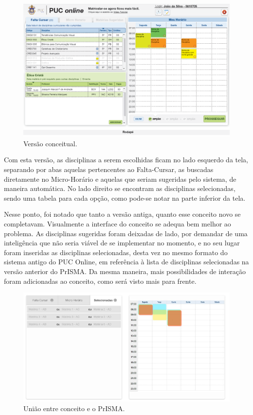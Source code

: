 \documentclass[graduacao,brazil]{ThesisPUC}
\begin{document}
\begin{figure}[H]
    \centering
    \includegraphics[width=\linewidth]{img/designer.png}
    \caption{Versão conceitual.}
\end{figure}

Com esta versão, as disciplinas a serem escolhidas ficam no lado esquerdo da tela, separando por abas aquelas pertencentes ao Falta-Cursar, as buscadas diretamente no Micro-Horário e aquelas que seriam sugeridas pelo sistema, de maneira automática. No lado direito se encontram as disciplinas selecionadas, sendo uma tabela para cada opção, como pode-se notar na parte inferior da tela.

Nesse ponto, foi notado que tanto a versão antiga, quanto esse conceito novo se completavam. Visualmente a interface do conceito se adequa bem melhor ao problema. As disciplinas sugeridas foram deixadas de lado, por demandar de uma inteligência que não seria viável de se implementar no momento, e no seu lugar foram inseridas as disciplinas selecionadas, desta vez no mesmo formato do sistema antigo do PUC Online, em referência à lista de disciplinas selecionadas na versão anterior do PrISMA. Da mesma maneira, mais possibilidades de interação foram adicionadas ao conceito, como será visto mais para frente.

\begin{figure}[H]
    \centering
    \includegraphics[width=\linewidth]{img/prisma-WF.jpg}
    \caption{União entre conceito e o PrISMA.}
\end{figure}
\end{document}
